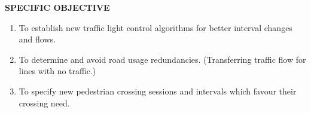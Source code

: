 \documentclass[11pt,a4paper,final]{report}
\begin{document}
\noindent 

\noindent \textbf{SPECIFIC OBJECTIVE}

\begin{enumerate}
\item \textbf{ }To establish new traffic light control algorithms for better interval changes and flows.

\item  To determine and avoid road usage redundancies. (Transferring traffic flow for lines with no traffic.)

\item  To specify new pedestrian crossing sessions and intervals which favour their crossing need.
\end{enumerate}
 
\end{document}
